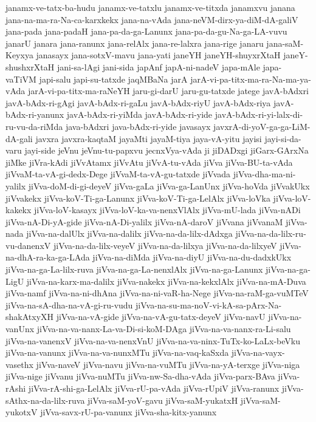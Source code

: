 {janamx-ve-tatx-ba-hudu
janamx-ve-tatxlu
janamx-ve-titxda
janamxvu
janana
jana-na-ma-ra-Na-ca-karxkekx
jana-na-vAda
jana-neVM-dirx-ya-diM-dA-galiV
jana-pada
jana-padaH
jana-pa-da-ga-Lanunx
jana-pa-da-gu-Na-ga-LA-vuvu
janarU
janara
jana-ranunx
jana-relAlx
jana-re-lalxra
jana-rige
janaru
jana-saM-Keyxya
janasayx
jana-sotxV-mavu
jana-yati
janeYH
janeYH-shuyxrXtaH
janeY-shushxrXtaH
jani-sa-lAgi
jani-sida
japAnf
japA-ni-nadeV
japa-mAle
japa-vaTiVM
japi-salu
japi-su-tatxde
jaqMBaNa
jarA
jarA-vi-pa-titx-ma-ra-Na-ma-ya-vAda
jarA-vi-pa-titx-ma-raNeYH
jaru-gi-darU
jaru-gu-tatxde
jatege
javA-bAdxri
javA-bAdx-ri-gAgi
javA-bAdx-ri-gaLu
javA-bAdx-riyU
javA-bAdx-riya
javA-bAdx-ri-yanunx
javA-bAdx-ri-yiMda
javA-bAdx-ri-yide
javA-bAdx-ri-yi-lalx-di-ru-vu-da-riMda
java-bAdxri
java-bAdx-ri-yide
javasayx
javxrA-di-yoV-ga-ga-LiM-dA-gali
javxra
javxra-kaqtaM
jayaMti
jayaM-tiya
jaya-vA-yitu
jayisi
jayi-si-da-varu
jayi-side
jeVnu
jeVnu-tu-papxvu
jecnxVya-vAda
ji
jiDADxgi
jiGarx-GArxNa
jiMke
jiVra-kAdi
jiVvAtamx
jiVvAtu
jiVvA-tu-vAda
jiVva
jiVva-BU-ta-vAda
jiVvaM-ta-vA-gi-dedx-Dege
jiVvaM-ta-vA-gu-tatxde
jiVvada
jiVva-dha-ma-ni-yalilx
jiVva-doM-di-gi-deyeV
jiVva-gaLa
jiVva-ga-LanUnx
jiVva-hoVda
jiVvakUkx
jiVvakekx
jiVva-koV-Ti-ga-Lanunx
jiVva-koV-Ti-ga-LelAlx
jiVva-loVka
jiVva-loV-kakekx
jiVva-loV-kasayx
jiVva-loV-ka-va-nenxVlAlx
jiVva-mU-lada
jiVva-nADi
jiVva-nA-Di-yA-gide
jiVva-nA-Di-yalilx
jiVva-nA-daroV
jiVvana
jiVvanaM
jiVva-nada
jiVva-na-dalUlx
jiVva-na-dalilx
jiVva-na-da-lilx-dAdxga
jiVva-na-da-lilx-ru-vu-danenxV
jiVva-na-da-lilx-veyeV
jiVva-na-da-lilxya
jiVva-na-da-lilxyeV
jiVva-na-dhA-ra-ka-ga-LAda
jiVva-na-diMda
jiVva-na-diyU
jiVva-na-du-dadxkUkx
jiVva-na-ga-La-lilx-ruva
jiVva-na-ga-La-nenxlAlx
jiVva-na-ga-Lanunx
jiVva-na-ga-LigU
jiVva-na-karx-ma-dalilx
jiVva-nakekx
jiVva-na-kekxlAlx
jiVva-na-mA-Duva
jiVva-namf
jiVva-na-ni-dhAna
jiVva-na-ni-vaR-ha-Nege
jiVva-na-raM-ga-vuMTeV
jiVva-na-sA-dha-na-vA-gi-ru-vudu
jiVva-na-su-ma-noV-vi-kA-sa-pArx-Na-shakAtxyXH
jiVva-na-vA-gide
jiVva-na-vA-gu-tatx-deyeV
jiVva-navU
jiVva-na-vanUnx
jiVva-na-va-nanx-La-va-Di-si-koM-DAga
jiVva-na-va-nanx-ra-Li-salu
jiVva-na-vanenxV
jiVva-na-va-nenxVnU
jiVva-na-va-ninx-TuTx-ko-LaLx-beVku
jiVva-na-vanunx
jiVva-na-va-nunxMTu
jiVva-na-vaq-kaSxda
jiVva-na-vayx-vasethx
jiVva-naveV
jiVva-navu
jiVva-na-vuMTu
jiVva-na-yA-terxge
jiVva-niga
jiVva-nige
jiVvanu
jiVva-nuMTu
jiVva-nw-Sa-dha-vAda
jiVva-parx-BAva
jiVva-rAshi
jiVva-rA-shi-ga-LelAlx
jiVva-rU-pa-vAda
jiVva-rUpiV
jiVva-ranunx
jiVva-sAthx-na-da-lilx-ruva
jiVva-saM-yoV-gavu
jiVva-saM-yukatxH
jiVva-saM-yukotxV
jiVva-savx-rU-pa-vanunx
jiVva-sha-kitx-yanunx
}
